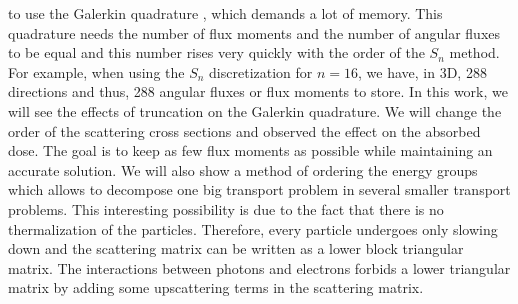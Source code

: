 to use the Galerkin quadrature \cite{graal}, which demands a lot of memory. This 
quadrature needs the number of flux moments and the number of angular fluxes to be 
equal and this number rises very quickly with the order of the $S_n$ method. 
For example, when using the $S_n$ discretization for $n=16$, we have, in 3D, 
288 directions and thus, 288 angular fluxes or flux moments to store. In this 
work, we will see the effects of truncation on the Galerkin quadrature. We will 
change the order of the scattering cross sections and observed the effect on the 
absorbed dose. The goal is to keep as few flux moments as possible while 
maintaining an accurate solution. We will also show a method of ordering
the energy groups which allows to decompose one big transport problem in
several smaller transport problems. This interesting possibility is due to
the fact that there is no thermalization of the particles. Therefore, every
particle undergoes only slowing down and the scattering matrix can be written
as a lower block triangular matrix. The interactions between photons and
electrons forbids a lower triangular matrix by adding some
upscattering terms in the scattering matrix.
